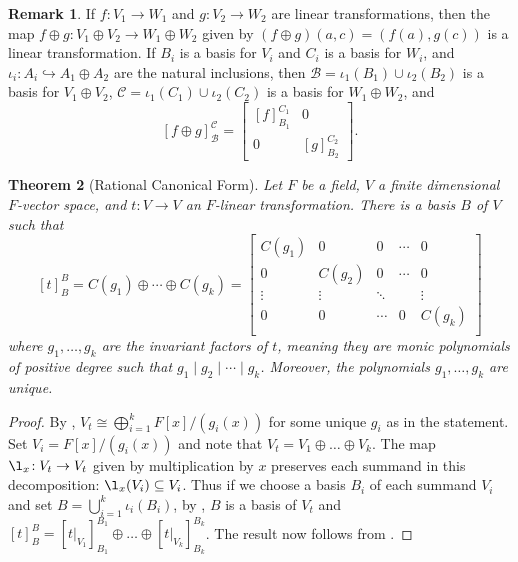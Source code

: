 \documentclass[12pt]{report}
\newtheorem{theorem}{Theorem}[chapter]
\numberwithin{equation}{section}
\numberwithin{theorem}{chapter}
\theoremstyle{definition}
\newtheorem{definition}[theorem]{Definition}
\newtheorem*{basic properties}{Basic Properties}
\newtheorem*{Important Remark}{Important Remark}
\newtheorem{remark}[theorem]{Remark}
\DeclareMathOperator{\M}{Mat}
\begin{document}
%


\begin{remark}\label{remark RCF}
If $f:V_1\to W_1$ and $g:V_2\to W_2$ are linear transformations, then the map $f\oplus g:V_1\oplus V_2\to W_1\oplus W_2$ given by $(f\oplus g)(a,c)= (f(a),g(c))$ is a linear transformation. If $B_i$ is a basis for $V_i$ and $C_i$ is a basis for $W_i$, and $\iota_i: A_i \hookrightarrow A_1 \oplus A_2$ are the natural inclusions, then $\mathcal{B}=\iota_1(B_1)\cup \iota_2(B_2)$ is a basis for $V_1\oplus V_2$, $\mathcal{C}=\iota_1(C_1)\cup \iota_2(C_2)$ is a basis for $W_1\oplus W_2$, and
$$[f\oplus g]_{\mathcal{B}}^{\mathcal{C}}=
\begin{bmatrix}
[f]_{B_1}^{C_1} & 0 \\
0 & [g]_{B_2}^{C_2}
\end{bmatrix}.$$
\end{remark}


\begin{theorem}[Rational Canonical Form]\label{RCF}
Let $F$ be a field, $V$ a finite dimensional $F$-vector space, and $t\!: V \to V$ an $F$-linear transformation. There is a basis $B$ of $V$ such that 
$$[t]_B^B=C(g_1) \oplus \cdots \oplus C(g_k) =
\begin{bmatrix}
C(g_1) & 0 & 0 & \cdots & 0 \\
0 & C(g_2)  & 0 & \cdots & 0 \\
\vdots & \vdots & \ddots &  & \vdots \\
0 & 0 & \cdots & 0 & C(g_k) \\
\end{bmatrix}$$
where $g_1, \dots, g_k$ are the invariant factors of $t$, meaning they are monic polynomials of positive degree such that $g_1 \mid g_2 \mid \cdots \mid g_k$. Moreover, the polynomials $g_1, \dots, g_k$ are unique.
\end{theorem}


\begin{proof} 
By , $V_t \cong \bigoplus_{i=1}^k F[x]/(g_i(x))$ for some unique $g_i$ as in the statement. Set $V_i=F[x]/(g_i(x))$ and note that $V_t=V_1\oplus \dots \oplus V_k$. The map $\l_x\!:V_t\to V_t$ given by multiplication by $x$ preserves each summand in this decomposition: $\l_x(V_i)\subseteq V_i$. Thus if we choose a basis $B_i$ of each summand $V_i$ and set $B=\bigcup_{i=1}^k \iota_i(B_i)$, by , $B$ is a basis of $V_t$ and $[t]_B^B=[t|_{V_1}]_{B_1}^{B_1}\oplus \dots \oplus [t|_{V_k}]_{B_k}^{B_k}$. The result now follows from .
\end{proof}
\end{document}
